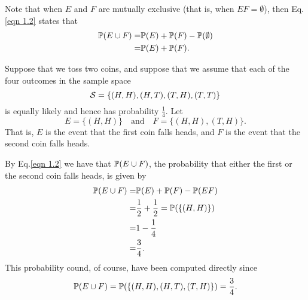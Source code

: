 \begin{remark}
    Note that when $E$ and $F$ are mutually exclusive (that is, when $EF = \emptyset$), then Eq.\eqref{eqn 1.2} states that 
    \begin{align*}
        \mathbb{P} (E \cup F) = & \mathbb{P} (E) + \mathbb{P} (F) - \mathbb{P} (\emptyset) \\ 
        = & \mathbb{P} (E) + \mathbb{P} (F).
    \end{align*}
\end{remark}

\begin{example}
    Suppose that we toss two coins, and suppose that we assume that each of the four outcomes in the sample space 
    \begin{equation*}
        \mathcal{S} = \{ (H,H), (H,T), (T,H), (T,T) \}
    \end{equation*}
    is equally likely and hence has probability $\frac{1}{4}$. Let 
    \begin{equation*}
        E = \{(H,H)\} \quad \text{and} \quad F = \{(H,H), (T,H)\}.
    \end{equation*}
    That is, $E$ is the event that the first coin falls heads, and $F$ is the event that the second coin falls heads. 

    By Eq.\eqref{eqn 1.2} we have that $\mathbb{P} (E \cup F)$, the probability that either the first or the second coin falls heads, is given by 
    \begin{align*}
        \mathbb{P} (E \cup F) = & \mathbb{P} (E) + \mathbb{P} (F) - \mathbb{P} (EF) \\ 
        = & \frac{1}{2} + \frac{1}{2} = \mathbb{P} (\{ (H, H) \}) \\ 
        = & 1 - \frac{1}{4} \\ 
        = & \frac{3}{4}.
    \end{align*}
    This probability cound, of course, have been computed directly since 
    \begin{equation*}
        \mathbb{P} (E \cup F) = \mathbb{P} ( \{ (H, H), (H,T), (T,H) \}) = \frac{3}{4}.
    \end{equation*}
\end{example}

